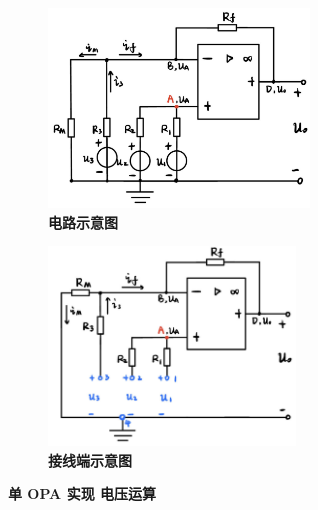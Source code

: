 \documentclass[UTF8]{report}
\theoremstyle{MyLineTheoremStyle} %
\theoremstyle{MyBlockTheoremStyle} %
\theoremstyle{MySubsubsectionStyle} %
\begin{document}
\begin{figure}[H]\centering
\begin{subfigure}[t]{0.43\textwidth}\centering
    \includegraphics[height=150pt]{assets/3/单OPA.png}
    \caption{\bfseries 电路示意图 }
\end{subfigure}\begin{subfigure}[t]{0.43\textwidth}\centering
    \includegraphics[height=150pt]{assets/3/单OPA接线端.png}
    \caption{\bfseries 接线端示意图 }
\end{subfigure}
\caption{\bfseries 单 OPA 实现 电压运算 }\label{单 OPA 实现 电压运算}
\end{figure}
\end{document}
